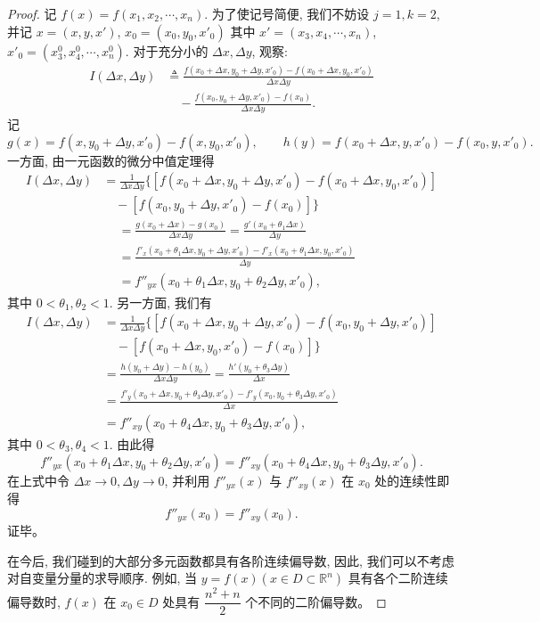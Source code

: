 \documentclass[UTF8,12pt,a4paper,fontset=fandol]{ctexart}
\begin{document}
\begin{proof}\quad 记 $f(x)=f(x_1,x_2,\cdots,x_n)$. 为了使记号简便, 我们不妨设 $j=1,k=2$, 并记 $x=(x,y,x')$, $x_0=(x_0,y_0,x'_0)$ 其中 $x'=(x_3,x_4,\cdots,x_n)$, $x'_0=(x_3^0,x_4^0,\cdots,x_n^0)$. 对于充分小的 $\Delta x,\Delta y$, 观察:
\[
\begin{aligned}
  I(\Delta x,\Delta y)
  &\triangleq
  \frac{f(x_0+\Delta x,y_0+\Delta y,x'_0)-f(x_0+\Delta x,y_0,x'_0)}{\Delta x\Delta y}\\
  &\quad-\frac{f(x_0,y_0+\Delta y,x'_0)-f(x_0)}{\Delta x\Delta y}.
\end{aligned}
\]
记
\[
  g(x)=f(x,y_0+\Delta y,x'_0)-f(x,y_0,x'_0),
  \qquad
  h(y)=f(x_0+\Delta x,y,x'_0)-f(x_0,y,x'_0).
\]
一方面, 由一元函数的微分中值定理得
\[
\begin{aligned}
  I(\Delta x,\Delta y)
  &=\frac1{\Delta x\Delta y}
  \{[f(x_0+\Delta x,y_0+\Delta y,x'_0)-f(x_0+\Delta x,y_0,x'_0)]\\
  &\quad-[f(x_0,y_0+\Delta y,x'_0)-f(x_0)]\}
\end{aligned}
\]
\[
\begin{aligned}
  &=\frac{g(x_0+\Delta x)-g(x_0)}{\Delta x\Delta y}
  =\frac{g'(x_0+\theta_1\Delta x)}{\Delta y}\\
  &=\frac{f'_x(x_0+\theta_1\Delta x,y_0+\Delta y,x'_0)
  -f'_x(x_0+\theta_1\Delta x,y_0,x'_0)}{\Delta y}\\
  &=f''_{yx}(x_0+\theta_1\Delta x,y_0+\theta_2\Delta y,x'_0),
\end{aligned}
\]
其中 $0<\theta_1,\theta_2<1$. 另一方面, 我们有
\[
\begin{aligned}
  I(\Delta x,\Delta y)
  &=\frac1{\Delta x\Delta y}
  \{[f(x_0+\Delta x,y_0+\Delta y,x'_0)-f(x_0,y_0+\Delta y,x'_0)]\\
  &\quad-[f(x_0+\Delta x,y_0,x'_0)-f(x_0)]\}\\
  &=\frac{h(y_0+\Delta y)-h(y_0)}{\Delta x\Delta y}
  =\frac{h'(y_0+\theta_3\Delta y)}{\Delta x}\\
  &=\frac{f'_y(x_0+\Delta x,y_0+\theta_3\Delta y,x'_0)
  -f'_y(x_0,y_0+\theta_3\Delta y,x'_0)}{\Delta x}\\
  &=f''_{xy}(x_0+\theta_4\Delta x,y_0+\theta_3\Delta y,x'_0),
\end{aligned}
\]
其中 $0<\theta_3,\theta_4<1$. 由此得
\[
  f''_{yx}(x_0+\theta_1\Delta x,y_0+\theta_2\Delta y,x'_0)
  =f''_{xy}(x_0+\theta_4\Delta x,y_0+\theta_3\Delta y,x'_0).
\]
在上式中令 $\Delta x\to0,\Delta y\to0$, 并利用 $f''_{yx}(x)$ 与 $f''_{xy}(x)$ 在 $x_0$ 处的连续性即得
\[
  f''_{yx}(x_0)=f''_{xy}(x_0).
\]
证毕。

在今后, 我们碰到的大部分多元函数都具有各阶连续偏导数, 因此, 我们可以不考虑对自变量分量的求导顺序. 例如, 当 $y=f(x)(x\in D\subset\mathbb R^n)$ 具有各个二阶连续偏导数时, $f(x)$ 在 $x_0\in D$ 处具有 $\dfrac{n^2+n}{2}$ 个不同的二阶偏导数。

\end{proof}
\end{document}
